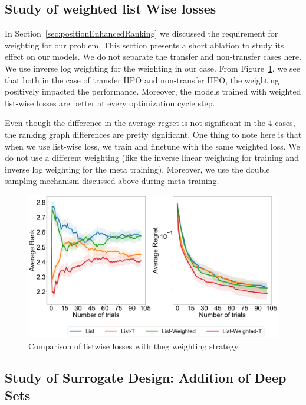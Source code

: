 \documentclass[12pt, twoside, ngerman]{report}
\begin{document}
\subsection{Study of weighted list Wise losses}

In Section~\ref{sec:positionEnhancedRanking} we discussed the requirement for weighting for our problem.
This section presents a short ablation to study its effect on our models.
We do not separate the transfer and non-transfer cases here.
We use inverse log weighting for the weighting in our case.
From Figure~\ref{fig:Q2Ablation}, we see that both in the case of transfer HPO and non-transfer HPO, the weighting positively impacted the performance. Moreover, the models trained with weighted list-wise losses are better at every optimization cycle step.

Even though the difference in the average regret is not significant in the 4 cases,  the ranking graph differences are pretty significant. One thing to note here is that when we use list-wise loss,  we train and finetune with the same weighted loss. We do not use a different weighting (like the inverse linear weighting for training and inverse log weighting for the meta training). Moreover, we use the double sampling mechanism discussed above during meta-training.

\begin{figure}[h]
  \centering
    \includegraphics[scale=0.25]{images/Q2Ablation}
    \caption{Comparison of listwise losses with theg weighting strategy.}
    \label{fig:Q2Ablation}
\end{figure}


\subsection{Study of Surrogate Design: Addition of Deep Sets}
\end{document}
